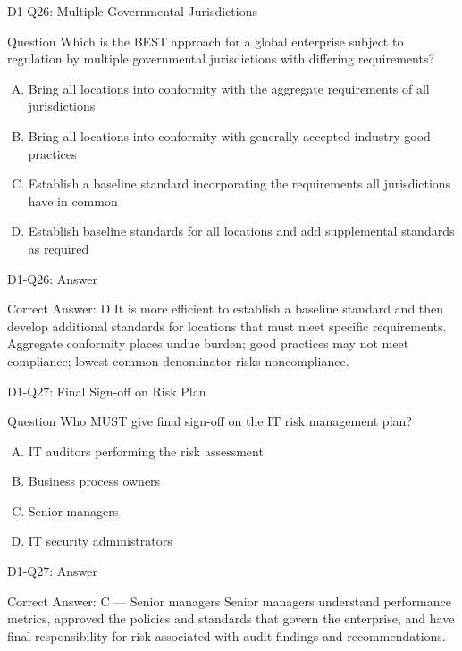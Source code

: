 \documentclass{beamer}
\begin{document}
	\begin{frame}{D1-Q26: Multiple Governmental Jurisdictions}
		\begin{block}{Question}
			Which is the BEST approach for a global enterprise subject to regulation by multiple governmental jurisdictions with differing requirements?
		\end{block}
		\begin{enumerate}[(A)]
			\item Bring all locations into conformity with the aggregate requirements of all jurisdictions
			\item Bring all locations into conformity with generally accepted industry good practices
			\item Establish a baseline standard incorporating the requirements all jurisdictions have in common
			\item Establish baseline standards for all locations and add supplemental standards as required
		\end{enumerate}
	\end{frame}
	\begin{frame}{D1-Q26: Answer}
		\begin{block}{Correct Answer: D}
			It is more efficient to establish a baseline standard and then develop additional standards for locations that must meet specific requirements. Aggregate conformity places undue burden; good practices may not meet compliance; lowest common denominator risks noncompliance.
		\end{block}
	\end{frame}
	
	\begin{frame}{D1-Q27: Final Sign-off on Risk Plan}
		\begin{block}{Question}
			Who MUST give final sign-off on the IT risk management plan?
		\end{block}
		\begin{enumerate}[(A)]
			\item IT auditors performing the risk assessment
			\item Business process owners
			\item Senior managers
			\item IT security administrators
		\end{enumerate}
	\end{frame}
	\begin{frame}{D1-Q27: Answer}
		\begin{block}{Correct Answer: C --- Senior managers}
			Senior managers understand performance metrics, approved the policies and standards that govern the enterprise, and have final responsibility for risk associated with audit findings and recommendations.
		\end{block}
	\end{frame}
	
\end{document}
